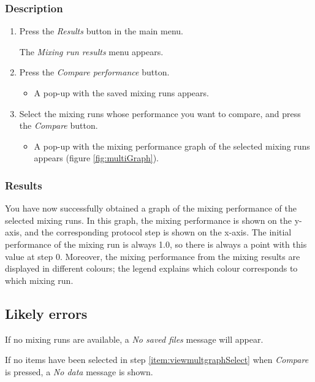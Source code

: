 \subsubsection{Description}\label{subsubsec:viewmultgraphDesc}
\begin{enumerate}
	\item Press the \emph{Results} button in the main menu.
		\begin{itemize}
            The \emph{Mixing run results} menu appears.
		\end{itemize}
	\item Press the \emph{Compare performance} button.
		\begin{itemize}
            \item A pop-up with the saved mixing runs appears.
		\end{itemize}
	\item Select the mixing runs whose performance you want to compare, and press the \emph{Compare} button.
		\begin{itemize}
            \item A pop-up with the mixing performance graph of the selected mixing runs appears (figure \ref{fig:multiGraph}).
		\end{itemize}
\end{enumerate}

\subsubsection{Results}
You have now successfully obtained a graph of the mixing performance of the selected mixing runs. In this graph, the mixing performance is shown on the y-axis, and the corresponding protocol step is shown on the x-axis. The initial performance of the mixing run is always 1.0, so there is always a point with this value at step 0. Moreover, the mixing performance from the mixing results are displayed in different colours; the legend explains which colour corresponds to which mixing run.

\subsection{Likely errors}
If no mixing runs are available, a \emph{No saved files} message will appear.

If no items have been selected in step \ref{item:viewmultgraphSelect} when \emph{Compare} is pressed, a \emph{No data} message is shown.


